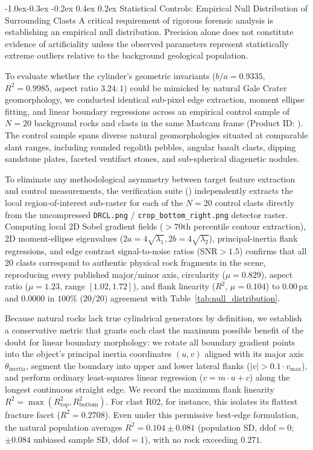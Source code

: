 \documentclass[11pt,a4paper]{article}
\makeatletter
\renewcommand\subsection{\@startsection{subsection}{2}{\z@}%
                                     {-1.0ex\@plus -0.3ex \@minus -0.2ex}%
                                     {0.4ex \@plus 0.2ex}%
                                     {\normalfont\normalsize\bfseries}}
\makeatother
\begin{document}
\subsection{Statistical Controls: Empirical Null Distribution of Surrounding Clasts}
A critical requirement of rigorous forensic analysis is establishing an empirical null distribution. Precision alone does not constitute evidence of artificiality unless the observed parameters represent statistically extreme outliers relative to the background geological population.

To evaluate whether the cylinder's geometric invariants ($b/a = 0.9335$, $R^2 = 0.9985$, aspect ratio $3.24:1$) could be mimicked by natural Gale Crater geomorphology, we conducted identical sub-pixel edge extraction, moment ellipse fitting, and linear boundary regressions across an empirical control sample of $N = 20$ background rocks and clasts in the same Mastcam frame (Product ID: ). The control sample spans diverse natural geomorphologies situated at comparable slant ranges, including rounded regolith pebbles, angular basalt clasts, dipping sandstone plates, faceted ventifact stones, and sub-spherical diagenetic nodules.

To eliminate any methodological asymmetry between target feature extraction and control measurements, the verification suite () independently extracts the local region-of-interest sub-raster for each of the $N = 20$ control clasts directly from the uncompressed \texttt{DRCL.png} / \texttt{crop\_bottom\_right.png} detector raster. Computing local 2D Sobel gradient fields ($>70\text{th}$ percentile contour extraction), 2D moment-ellipse eigenvalues ($2a = 4\sqrt{\lambda_1}, 2b = 4\sqrt{\lambda_2}$), principal-inertia flank regressions, and edge contrast signal-to-noise ratios ($\text{SNR} > 1.5$) confirms that all 20 clasts correspond to authentic physical rock fragments in the scene, reproducing every published major/minor axis, circularity ($\mu = 0.829$), aspect ratio ($\mu = 1.23$, range $[1.02, 1.72]$), and flank linearity ($R^2$, $\mu = 0.104$) to $0.00\,\text{px}$ and $0.0000$ in $100\%$ ($20/20$) agreement with Table~\ref{tab:null_distribution}.

Because natural rocks lack true cylindrical generators by definition, we establish a conservative metric that grants each clast the maximum possible benefit of the doubt for linear boundary morphology: we rotate all boundary gradient points into the object's principal inertia coordinates $(u, v)$ aligned with its major axis $\theta_{\text{inertia}}$, segment the boundary into upper and lower lateral flanks ($|v| > 0.1 \cdot v_{\max}$), and perform ordinary least-squares linear regression ($v = m \cdot u + c$) along the longest continuous straight edge. We record the maximum flank linearity $R^2 = \max(R^2_{\text{top}}, R^2_{\text{bottom}})$. For clast R02, for instance, this isolates its flattest fracture facet ($R^2 = 0.2708$). Even under this permissive best-edge formulation, the natural population averages $\overline{R^2} = 0.104 \pm 0.081$ (population SD, $\text{ddof}=0$; $\pm 0.084$ unbiased sample SD, $\text{ddof}=1$), with no rock exceeding $0.271$.
\end{document}
